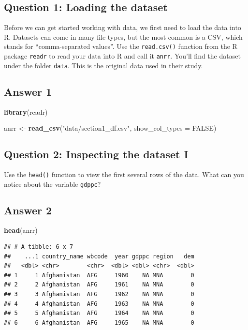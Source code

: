 \documentclass[
  11pt,
  letterpaper]{article}
\newenvironment{Shaded}{\begin{snugshade}}{\end{snugshade}}
\newcommand{\AttributeTok}[1]{\textcolor[rgb]{0.13,0.29,0.53}{#1}}
\newcommand{\ConstantTok}[1]{\textcolor[rgb]{0.56,0.35,0.01}{#1}}
\newcommand{\FunctionTok}[1]{\textcolor[rgb]{0.13,0.29,0.53}{\textbf{#1}}}
\newcommand{\NormalTok}[1]{#1}
\newcommand{\OtherTok}[1]{\textcolor[rgb]{0.56,0.35,0.01}{#1}}
\newcommand{\StringTok}[1]{\textcolor[rgb]{0.31,0.60,0.02}{#1}}
\begin{document}
\subsection{Question 1: Loading the
dataset}\label{question-1-loading-the-dataset}

Before we can get started working with data, we first need to load the
data into R. Datasets can come in many file types, but the most common
is a CSV, which stands for ``comma-separated values''. Use the
\texttt{read.csv()} function from the R package \texttt{readr} to read
your data into R and call it \texttt{anrr}. You'll find the dataset
under the folder \texttt{data}. This is the original data used in their
study.

\subsection{Answer 1}\label{answer-1}

\begin{Shaded}
\begin{Highlighting}[]
\FunctionTok{library}\NormalTok{(readr)}

\NormalTok{anrr }\OtherTok{\textless{}{-}} \FunctionTok{read\_csv}\NormalTok{(}\StringTok{"data/section1\_df.csv"}\NormalTok{, }
                \AttributeTok{show\_col\_types =} \ConstantTok{FALSE}\NormalTok{)}
\end{Highlighting}
\end{Shaded}

\subsection{Question 2: Inspecting the dataset
I}\label{question-2-inspecting-the-dataset-i}

Use the \texttt{head()} function to view the first several rows of the
data. What can you notice about the variable \texttt{gdppc}?

\subsection{Answer 2}\label{answer-2}

\begin{Shaded}
\begin{Highlighting}[]
\FunctionTok{head}\NormalTok{(anrr)}
\end{Highlighting}
\end{Shaded}

\begin{verbatim}
## # A tibble: 6 x 7
##    ...1 country_name wbcode  year gdppc region   dem
##   <dbl> <chr>        <chr>  <dbl> <dbl> <chr>  <dbl>
## 1     1 Afghanistan  AFG     1960    NA MNA        0
## 2     2 Afghanistan  AFG     1961    NA MNA        0
## 3     3 Afghanistan  AFG     1962    NA MNA        0
## 4     4 Afghanistan  AFG     1963    NA MNA        0
## 5     5 Afghanistan  AFG     1964    NA MNA        0
## 6     6 Afghanistan  AFG     1965    NA MNA        0
\end{verbatim}
\end{document}
